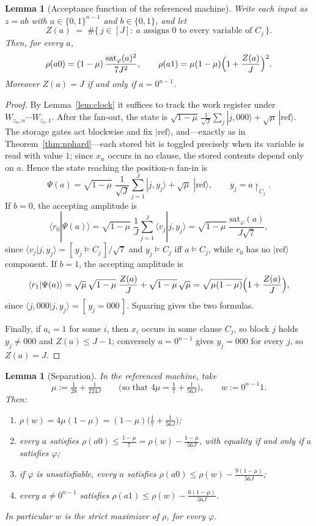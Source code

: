 \documentclass[11pt]{amsart}
\newtheorem{lemma}[theorem]{Lemma}
\theoremstyle{definition}
\theoremstyle{remark}
\begin{document}
\begin{lemma}[Acceptance function of the referenced
machine]\label{lem:refaccept}
Write each input as $z=ab$ with $a\in\{0,1\}^{n-1}$ and
$b\in\{0,1\}$, and let
\[
  Z(a)\;=\;\#\{\,j\in[J]:\ a\text{ assigns }0\text{ to every
  variable of }C_j\,\}.
\]
Then, for every $a$,
\[
  \rho(a0)=(1-\mu)\,\frac{\mathrm{sat}_\varphi(a)^2}{7J^2},
  \qquad
  \rho(a1)=\mu(1-\mu)\Bigl(1+\frac{Z(a)}J\Bigr)^{2}.
\]
Moreover $Z(a)=J$ if and only if $a=0^{n-1}$.
\end{lemma}

\begin{proof}
By Lemma~\ref{lem:clock} it suffices to track the work register
under $W_{z_n,n}\cdots W_{z_1,1}$. After the fan-out, the state is
$\sqrt{1-\mu}\,\frac1{\sqrt J}\sum_j|j,000\rangle
+\sqrt\mu\,|\mathrm{ref}\rangle$. The storage gates act blockwise
and fix $|\mathrm{ref}\rangle$, and---exactly as in
Theorem~\ref{thm:nphard}---each stored bit is toggled precisely when
its variable is read with value $1$; since $x_n$ occurs in no
clause, the stored contents depend only on $a$. Hence the state
reaching the position-$n$ fan-in is
\[
  \Psi(a)=\sqrt{1-\mu}\;\frac1{\sqrt J}\sum_{j=1}^J|j,y_j\rangle
  +\sqrt{\mu}\;|\mathrm{ref}\rangle ,
  \qquad y_j=a\!\restriction_{C_j}.
\]
If $b=0$, the accepting amplitude is
\[
  \langle r_0|\Psi(a)\rangle
  =\sqrt{1-\mu}\;\frac1{J}\sum_{j=1}^J\langle v_j|j,y_j\rangle
  =\sqrt{1-\mu}\;\frac{\mathrm{sat}_\varphi(a)}{J\sqrt7},
\]
since $\langle v_j|j,y_j\rangle=[\,y_j\models C_j\,]/\sqrt7$ and
$y_j\models C_j$ iff $a\models C_j$, while $r_0$ has no
$|\mathrm{ref}\rangle$ component. If $b=1$, the accepting amplitude
is
\[
  \langle r_1|\Psi(a)\rangle
  =\sqrt{\mu}\,\sqrt{1-\mu}\;\frac{Z(a)}J
  +\sqrt{1-\mu}\,\sqrt{\mu}
  =\sqrt{\mu(1-\mu)}\Bigl(1+\frac{Z(a)}J\Bigr),
\]
since $\langle j,000|j,y_j\rangle=[\,y_j=000\,]$. Squaring gives the
two formulas.

Finally, if $a_i=1$ for some $i$, then $x_i$ occurs in some clause
$C_j$, so block $j$ holds $y_j\ne000$ and $Z(a)\le J-1$; conversely
$a=0^{n-1}$ gives $y_j=000$ for every $j$, so $Z(a)=J$.
\end{proof}

\begin{lemma}[Separation]\label{lem:refsep}
In the referenced machine, take
\[
  \mu:=\tfrac1{28}+\tfrac1{224J}
  \qquad\text{(so that } 4\mu=\tfrac17+\tfrac1{56J}\text{)},
  \qquad w:=0^{n-1}1 .
\]
Then:
\begin{enumerate}
\item $\rho(w)=4\mu(1-\mu)
  =(1-\mu)\bigl(\tfrac17+\tfrac1{56J}\bigr)$;
\item every $a$ satisfies
  $\rho(a0)\le\frac{1-\mu}7=\rho(w)-\frac{1-\mu}{56J}$, with
  equality if and only if $a$ satisfies $\varphi$;
\item if $\varphi$ is unsatisfiable, every $a$ satisfies
  $\rho(a0)\le\rho(w)-\frac{9(1-\mu)}{56J}$;
\item every $a\ne0^{n-1}$ satisfies
  $\rho(a1)\le\rho(w)-\frac{6(1-\mu)}{56J}$.
\end{enumerate}
In particular $w$ is the strict maximizer of $\rho$, for every
$\varphi$.
\end{lemma}
\end{document}
